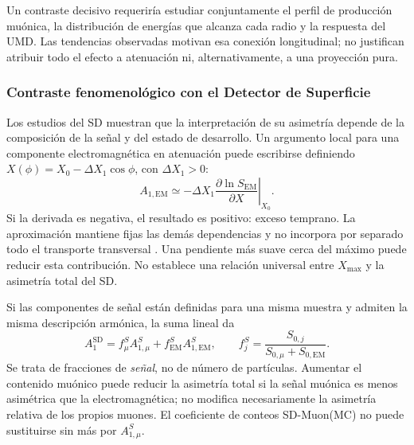 Un contraste decisivo requeriría estudiar conjuntamente el perfil de producción muónica, la distribución de energías que alcanza cada radio y la respuesta del UMD. Las tendencias observadas motivan esa conexión longitudinal; no justifican atribuir todo el efecto a atenuación ni, alternativamente, a una proyección pura.

\subsubsection{Contraste fenomenológico con el Detector de Superficie}
\label{subsec:contraste_sd_bradfield}

Los estudios del SD \cite{BradfieldThesis} muestran que la interpretación de su asimetría depende de la composición de la señal y del estado de desarrollo. Un argumento local para una componente electromagnética en atenuación puede escribirse definiendo $X(\phi)=X_0-\Delta X_1\cos\phi$, con $\Delta X_1>0$:
\begin{equation}
A_{1,\mathrm{EM}}\simeq-\Delta X_1
\left.\frac{\partial\ln S_{\mathrm{EM}}}{\partial X}\right|_{X_0}.
\label{eq:asym_em_taylor}
\end{equation}
Si la derivada es negativa, el resultado es positivo: exceso temprano. La aproximación mantiene fijas las demás dependencias y no incorpora por separado todo el transporte transversal \cite{dova2003}. Una pendiente más suave cerca del máximo puede reducir esta contribución. No establece una relación universal entre $X_{\mathrm{max}}$ y la asimetría total del SD.

Si las componentes de señal están definidas para una misma muestra y admiten la misma descripción armónica, la suma lineal da
\begin{equation}
A_1^{\mathrm{SD}}=
f_\mu^S A_{1,\mu}^S+f_{\mathrm{EM}}^S A_{1,\mathrm{EM}}^S,
\qquad
f_j^S=\frac{S_{0,j}}{S_{0,\mu}+S_{0,\mathrm{EM}}}.
\end{equation}
Se trata de fracciones de \emph{señal}, no de número de partículas. Aumentar el contenido muónico puede reducir la asimetría total si la señal muónica es menos asimétrica que la electromagnética; no modifica necesariamente la asimetría relativa de los propios muones. El coeficiente de conteos SD-Muon(MC) no puede sustituirse sin más por $A_{1,\mu}^S$.

